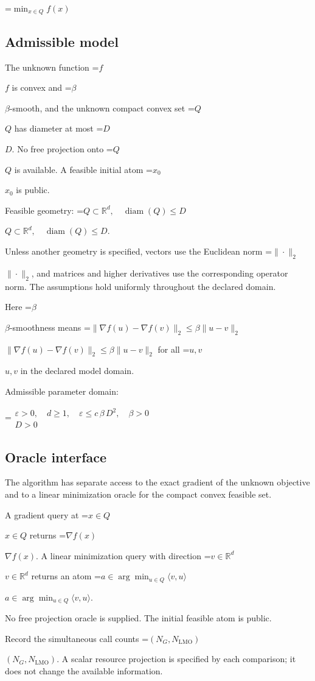 \documentclass[10pt,a4paper]{article}
\newcommand{\AtlasMath}[1]{\par\begingroup\centering\setbox0=\hbox{$\displaystyle #1$}\ifdim\wd0>1.4\linewidth\typeout{ATLAS WIDE FORMULA: \the\wd0}\fi\ifdim\wd0>\linewidth\resizebox{\linewidth}{!}{\box0}\else\box0\fi\par\endgroup}
\newcommand{\AtlasInlineMath}[1]{\begingroup\setbox0=\hbox{$#1$}\ifdim\wd0>.4\linewidth\endgroup\AtlasMath{#1}\else\endgroup$#1$\fi}
\begin{document}
\AtlasMath{\min_{x\in Q}f(x)}


\subsection{Admissible model}
The unknown function \AtlasInlineMath{f} is convex and \AtlasInlineMath{\beta}-smooth, and the unknown compact convex set \AtlasInlineMath{Q} has diameter at most \AtlasInlineMath{D}. No free projection onto \AtlasInlineMath{Q} is available. A feasible initial atom \AtlasInlineMath{x_0} is public.

Feasible geometry: \AtlasInlineMath{Q\subset\mathbb{R}^d,\quad\operatorname{diam}(Q)\le D}.

Unless another geometry is specified, vectors use the Euclidean norm \AtlasInlineMath{\|\cdot\|_2}, and matrices and higher derivatives use the corresponding operator norm. The assumptions hold uniformly throughout the declared domain.

Here \AtlasInlineMath{\beta}-smoothness means \AtlasInlineMath{\|\nabla f(u)-\nabla f(v)\|_2\le\beta\|u-v\|_2} for all \AtlasInlineMath{u,v} in the declared model domain.

Admissible parameter domain:


\AtlasMath{\begin{gathered}\varepsilon > 0,\quad d \ge 1,\quad \varepsilon \le c\,\beta\,{D}^{2},\quad \beta > 0\\D > 0\end{gathered}}


\subsection{Oracle interface}
The algorithm has separate access to the exact gradient of the unknown objective and to a linear minimization oracle for the compact convex feasible set.

A gradient query at \AtlasInlineMath{x\in Q} returns \AtlasInlineMath{\nabla f(x)}. A linear minimization query with direction \AtlasInlineMath{v\in\mathbb R^d} returns an atom \AtlasInlineMath{a\in\arg\min_{u\in Q}\langle v,u\rangle}.

No free projection oracle is supplied. The initial feasible atom is public.

Record the simultaneous call counts \AtlasInlineMath{(N_G,N_{\mathrm{LMO}})}. A scalar resource projection is specified by each comparison; it does not change the available information.
\end{document}
